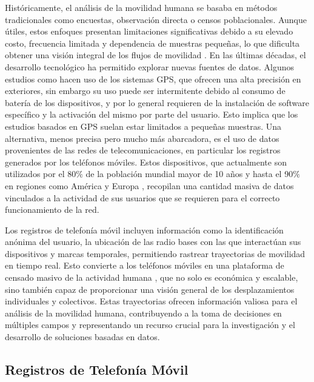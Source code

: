 Históricamente, el análisis de la movilidad humana se basaba en métodos tradicionales como encuestas, observación directa o censos poblacionales. Aunque útiles, estos enfoques presentan limitaciones significativas debido a su elevado costo, frecuencia limitada y dependencia de muestras pequeñas, lo que dificulta obtener una visión integral de los flujos de movilidad \cite{asgari2013survey}. En las últimas décadas, el desarrollo tecnológico ha permitido explorar nuevas fuentes de datos. Algunos estudios como \cite{gong2012gps} hacen uso de los sistemas GPS, que ofrecen una alta precisión en exteriores, sin embargo su uso puede ser intermitente debido al consumo de batería de los dispositivos, y por lo general requieren de la instalación de software específico y la activación del mismo por parte del usuario. Esto implica que los estudios basados en GPS suelan estar limitados a pequeñas muestras. Una alternativa, menos precisa pero mucho más abarcadora, es el uso de datos provenientes de las redes de telecomunicaciones, en particular los registros generados por los teléfonos móviles. Estos dispositivos, que actualmente son utilizados por el 80$\%$ de la población mundial mayor de 10 años y hasta el 90$\%$ en regiones como América y Europa \cite{ITU2024}, recopilan una cantidad masiva de datos vinculados a la actividad de sus usuarios \cite{toole2015path} que se requieren para el correcto funcionamiento de la red.

Los registros de telefonía móvil incluyen información como la identificación anónima del usuario, la ubicación de las radio bases con las que interactúan sus dispositivos y marcas temporales, permitiendo rastrear trayectorias de movilidad en tiempo real. Esto convierte a los teléfonos móviles en una plataforma de censado masivo de la actividad humana \cite{doyle2014population}, que no solo es económica y escalable, sino también capaz de proporcionar una visión general de los desplazamientos individuales y colectivos. Estas trayectorias ofrecen información valiosa para el análisis de la movilidad humana, contribuyendo a la toma de decisiones en múltiples campos y representando un recurso crucial para la investigación y el desarrollo de soluciones basadas en datos.

\subsection*{Registros de Telefonía Móvil}

